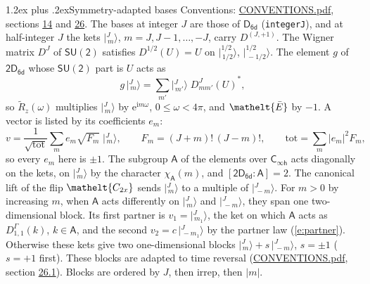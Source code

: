 \documentclass[10pt,a4paper]{article}
\makeatletter
\renewcommand\section{\@startsection{section}{1}{\z@}{-3ex plus -1ex minus -.2ex}%
  {1.2ex plus .2ex}{\normalfont\large\sffamily\bfseries\color{parttitle}}}
\numberwithin{equation}{section}
\newcommand{\eltfont}[1]{{\let\sigma\eltsigma\mathelt{#1}}}
\newcommand{\grp}[1]{\mathsf{#1}}
\newcommand{\elt}[1]{\eltfont{#1}}
\newcommand{\grpindex}[2]{[#1 : #2]}
\newcommand{\iunit}{\mathrm{i}}
\newcommand{\expe}{\mathrm{e}}
\newcommand{\irrJp}[2]{D^{(#1,#2)}}
\newcommand{\repD}[1]{D^{#1}}
\newcommand{\wignerD}[1]{D^{#1}}
\newcommand{\chiA}{\chi_{\grp{A}}}
\newcommand{\conj}[1]{{#1}^{*}}
\newcommand{\jm}[2]{\bigl\lvert{}^{#1}_{\,#2}\bigr\rangle}
\newcommand{\barred}[1]{\bar{#1}}
\newcommand{\lift}[1]{\tilde{#1}}
\makeatother
\begin{document}
\section{Symmetry-adapted bases}\label{s:bases}
Conventions: \href{../../CONVENTIONS.pdf}{CONVENTIONS.pdf}, sections \href{../../../rotation/CONVENTIONS.pdf\#conv.14}{14} and \href{../../CONVENTIONS.pdf\#conv.26}{26}.
\leavevmode\label{n:index.m}\label{n:vector.ket}The bases at integer $J$ are those of \href{../../../rotation/data/pdf/D6d.pdf}{$\grp{D_{6d}}$} (\texttt{integerJ}), and at half-integer $J$ the kets $\jm{J}{m}$, $m = J, J-1, \dots, -J$, carry $\irrJp{J}{+1}$. \label{n:matrix.wigner}The Wigner matrix $\wignerD{J}$ of $\grp{SU(2)}$ satisfies $\wignerD{1/2}(U) = U$ on $\jm{1/2}{1/2}$, $\jm{1/2}{-1/2}$. The element $g$ of $\grp{2D_{6d}}$ whose $\grp{SU(2)}$ part is $U$ acts as
\begin{equation}\label{e:action}g\,\jm{J}{m} = \sum_{m'} \jm{J}{m'}\; \conj{\wignerD{J}_{m m'}(U)},\end{equation}
so $\lift{R}_{z}(\omega)$ multiplies $\jm{J}{m}$ by $\expe^{\iunit m\omega}$, $0 \le \omega < 4\pi$, and $\elt{\barred{E}}$ by $-1$. \label{n:index.ketcoefficient}\label{n:vector.basis.symmetry}\label{n:index.ketweight}\label{n:index.total}A vector is listed by its coefficients $e_m$:
\begin{equation}\label{e:ket}v = \frac{1}{\sqrt{\mathrm{tot}}}\sum_m e_m\sqrt{F_m}\;\jm{J}{m},\qquad F_m = (J+m)!\,(J-m)!,\qquad \mathrm{tot} = \sum_m |e_m|^2F_m,\end{equation}
so every $e_m$ here is $\pm 1$.
\leavevmode\label{n:group.A}\label{n:function.character.abelian}The subgroup $\grp{A}$ of the elements over $\grp{C_{\infty h}}$ acts diagonally on the kets, on $\jm{J}{m}$ by the character $\chiA(m)$, and $\grpindex{\grp{2D_{6d}}}{\grp{A}} = 2$. The canonical lift of the flip $\elt{C_{2x}}$ sends $\jm{J}{m}$ to a multiple of $\jm{J}{-m}$. For $m > 0$ by increasing $m$, when $\grp{A}$ acts differently on $\jm{J}{m}$ and $\jm{J}{-m}$, they span one two-dimensional block. \label{n:index.partner.sign}Its first partner is $v_1 = \jm{J}{m_1}$, the ket on which $\grp{A}$ acts as $\repD{\Gamma}_{1,1}(k)$, $k \in \grp{A}$, and the second $v_2 = c\,\jm{J}{-m_1}$ by the partner law (\ref{e:partner}). \label{n:index.pair.sign}Otherwise these kets give two one-dimensional blocks $\jm{J}{m} + s\,\jm{J}{-m}$, $s = \pm 1$ ($s = +1$ first). These blocks are adapted to time reversal (\href{../../CONVENTIONS.pdf}{CONVENTIONS.pdf}, section \href{../../CONVENTIONS.pdf\#conv.26.1}{26.1}). Blocks are ordered by $J$, then irrep, then $|m|$.
\end{document}
